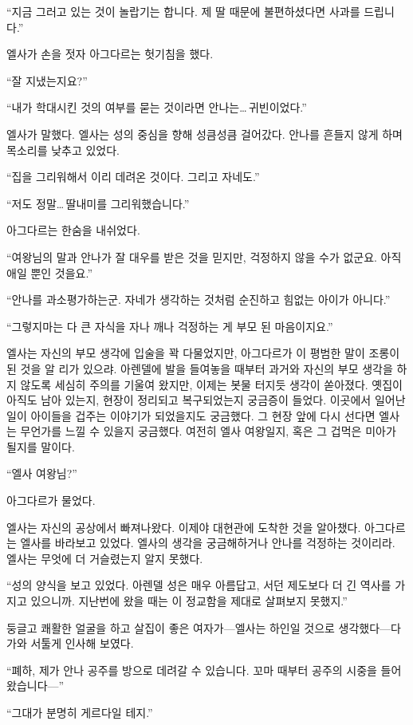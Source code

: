 `` 지금 그러고 있는 것이 놀랍기는 합니다. 제 딸 때문에 불편하셨다면 사과를 드립니다.''

엘사가 손을 젓자 아그다르는 헛기침을 했다.

``잘 지냈는지요?''

``내가 학대시킨 것의 여부를 묻는 것이라면 안나는\ldots\,귀빈이었다.''

엘사가 말했다. 엘사는 성의 중심을 향해 성큼성큼 걸어갔다. 안나를 흔들지 않게 하며 목소리를 낮추고 있었다.

``집을 그리워해서 이리 데려온 것이다. 그리고 자네도.''

``저도 정말\ldots\,딸내미를 그리워했습니다.''

아그다르는 한숨을 내쉬었다.

``여왕님의 말과 안나가 잘 대우를 받은 것을 믿지만, 걱정하지 않을 수가 없군요. 아직 애일 뿐인 것을요.''

``안나를 과소평가하는군. 자네가 생각하는 것처럼 순진하고 힘없는 아이가 아니다.''

``그렇지마는 다 큰 자식을 자나 깨나 걱정하는 게 부모 된 마음이지요.''

엘사는 자신의 부모 생각에 입술을 꽉 다물었지만, 아그다르가 이 평범한 말이 조롱이 된 것을 알 리가 있으랴. 아렌델에 발을 들여놓을 때부터 과거와 자신의 부모 생각을 하지 않도록 세심히 주의를 기울여 왔지만, 이제는 봇물 터지듯 생각이 쏟아졌다. 옛집이 아직도 남아 있는지, 현장이 정리되고 복구되었는지 궁금증이 들었다. 이곳에서 일어난 일이 아이들을 겁주는 이야기가 되었을지도 궁금했다. 그 현장 앞에 다시 선다면 엘사는 무언가를 느낄 수 있을지 궁금했다. 여전히 엘사 여왕일지, 혹은 그 겁먹은 미아가 될지를 말이다.

``엘사 여왕님?''

아그다르가 물었다.

엘사는 자신의 공상에서 빠져나왔다. 이제야 대현관에 도착한 것을 알아챘다. 아그다르는 엘사를 바라보고 있었다. 엘사의 생각을 궁금해하거나 안나를 걱정하는 것이리라. 엘사는 무엇에 더 거슬렸는지 알지 못했다.

``성의 양식을 보고 있었다. 아렌델 성은 매우 아름답고, 서던 제도보다 더 긴 역사를 가지고 있으니까. 지난번에 왔을 때는 이 정교함을 제대로 살펴보지 못했지.''

둥글고 쾌활한 얼굴을 하고 살집이 좋은 여자가—엘사는 하인일 것으로 생각했다—다가와 서툴게 인사해 보였다.

``폐하, 제가 안나 공주를 방으로 데려갈 수 있습니다. 꼬마 때부터 공주의 시중을 들어왔습니다—''

``그대가 분명히 게르다일 테지.''

